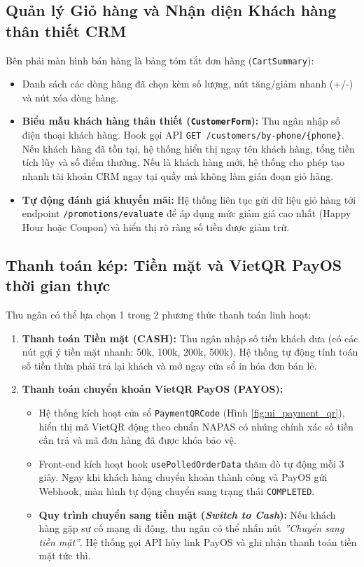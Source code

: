 \subsection{Quản lý Giỏ hàng và Nhận diện Khách hàng thân thiết CRM}
Bên phải màn hình bán hàng là bảng tóm tắt đơn hàng (\texttt{CartSummary}):
\begin{itemize}[leftmargin=1.5cm]
    \item Danh sách các dòng hàng đã chọn kèm số lượng, nút tăng/giảm nhanh (+/-) và nút xóa dòng hàng.
    \item \textbf{Biểu mẫu khách hàng thân thiết (\texttt{CustomerForm}):} Thu ngân nhập số điện thoại khách hàng. Hook gọi API \texttt{GET /customers/by-phone/\{phone\}}. Nếu khách hàng đã tồn tại, hệ thống hiển thị ngay tên khách hàng, tổng tiền tích lũy và số điểm thưởng. Nếu là khách hàng mới, hệ thống cho phép tạo nhanh tài khoản CRM ngay tại quầy mà không làm gián đoạn giỏ hàng.
    \item \textbf{Tự động đánh giá khuyến mãi:} Hệ thống liên tục gửi dữ liệu giỏ hàng tới endpoint \texttt{/promotions/evaluate} để áp dụng mức giảm giá cao nhất (Happy Hour hoặc Coupon) và hiển thị rõ ràng số tiền được giảm trừ.
\end{itemize}

\subsection{Thanh toán kép: Tiền mặt và VietQR PayOS thời gian thực}
Thu ngân có thể lựa chọn 1 trong 2 phương thức thanh toán linh hoạt:
\begin{enumerate}[label=\arabic*., leftmargin=1.5cm]
    \item \textbf{Thanh toán Tiền mặt (CASH):} Thu ngân nhập số tiền khách đưa (có các nút gợi ý tiền mặt nhanh: 50k, 100k, 200k, 500k). Hệ thống tự động tính toán số tiền thừa phải trả lại khách và mở ngay cửa sổ in hóa đơn bán lẻ.
    \item \textbf{Thanh toán chuyển khoản VietQR PayOS (PAYOS):}
    \begin{itemize}
        \item Hệ thống kích hoạt cửa sổ \texttt{PaymentQRCode} (Hình \ref{fig:ui_payment_qr}), hiển thị mã VietQR động theo chuẩn NAPAS có nhúng chính xác số tiền cần trả và mã đơn hàng đã được khóa bảo vệ.
        \item Front-end kích hoạt hook \texttt{usePolledOrderData} thăm dò tự động mỗi 3 giây. Ngay khi khách hàng chuyển khoản thành công và PayOS gửi Webhook, màn hình tự động chuyển sang trạng thái \texttt{COMPLETED}.
        \item \textbf{Quy trình chuyển sang tiền mặt (\textit{Switch to Cash}):} Nếu khách hàng gặp sự cố mạng di động, thu ngân có thể nhấn nút \textit{''Chuyển sang tiền mặt''}. Hệ thống gọi API hủy link PayOS và ghi nhận thanh toán tiền mặt tức thì.
    \end{itemize}
\end{enumerate}

